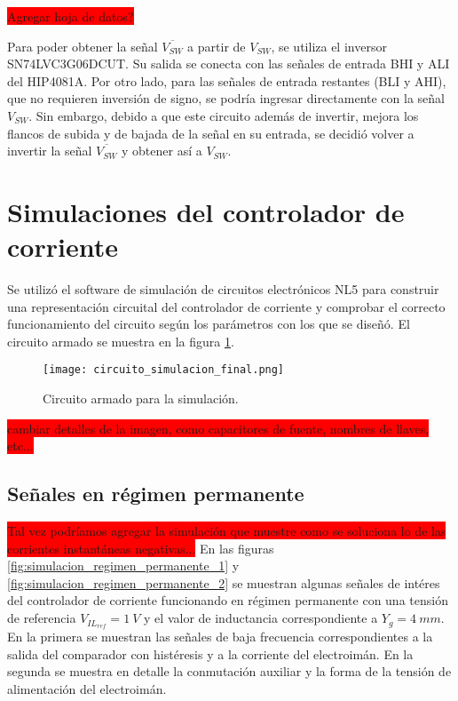 \colorbox{red}{Agregar hoja de datos?}

Para poder obtener la señal $\overline{V_{SW}}$ a partir de $V_{SW}$, se utiliza el inversor SN74LVC3G06DCUT. Su salida se conecta con las señales de entrada BHI y ALI del HIP4081A. Por otro lado, para las señales de entrada restantes (BLI y AHI), que no requieren inversión de signo, se podría ingresar directamente con la señal $V_{SW}$. Sin embargo, debido a que este circuito además de invertir, mejora los flancos de subida y de bajada de la señal en su entrada, se decidió volver a invertir la señal $\overline{V_{SW}}$ y obtener así a $V_{SW}$. 


\section{Simulaciones del controlador de corriente}

Se utilizó el software de simulación de circuitos electrónicos NL5 para construir una representación circuital del controlador de corriente y comprobar el correcto funcionamiento del circuito según los parámetros con los que se diseñó. El circuito armado se muestra en la figura \ref{fig:circuito_simulacion_final}.


\begin{figure}[H]
	\centering
	\texttt{[image: circuito\_simulacion\_final.png]}
	\caption{Circuito armado para la simulación.}
	\label{fig:circuito_simulacion_final}
\end{figure}

\colorbox{red}{cambiar detalles de la imagen, como capacitores de fuente, nombres de llaves, etc...}


\subsection{Señales en régimen permanente}

\colorbox{red}{Tal vez podríamos agregar la simulación que muestre como se soluciona lo de las corrientes instantáneas negativas...}
En las figuras \ref{fig:simulacion_regimen_permanente_1} y \ref{fig:simulacion_regimen_permanente_2} se muestran algunas señales de intéres del controlador de corriente funcionando en régimen permanente con una tensión de referencia $V_{IL_{ref}}=1\:V$ y el valor de inductancia correspondiente a $Y_g=4\:mm$. En la primera se muestran las señales de baja frecuencia correspondientes a la salida del comparador con histéresis y a la corriente del electroimán. En la segunda se muestra en detalle la conmutación auxiliar y la forma de la tensión de alimentación del electroimán.

